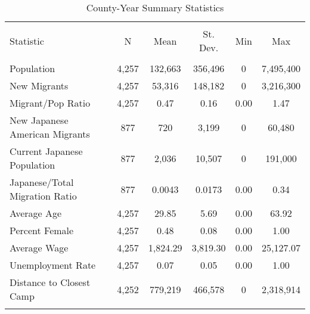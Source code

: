 
\begin{table}[!h] \centering 
  \caption{County-Year Summary Statistics} 
  \label{ctysumstats} 
\begin{tabular}{@{\extracolsep{5pt}}lccccc} 
\\[-1.8ex]\hline 
\hline \\[-1.8ex] 
Statistic & \multicolumn{1}{c}{N} & \multicolumn{1}{c}{Mean} & \multicolumn{1}{c}{St. Dev.} & \multicolumn{1}{c}{Min} & \multicolumn{1}{c}{Max} \\ 
\hline \\[-1.8ex] 
Population & 4,257 & 132,663 & 356,496 & 0 & 7,495,400 \\ 
New Migrants & 4,257 & 53,316 & 148,182 & 0 & 3,216,300 \\ 
Migrant/Pop Ratio & 4,257 & 0.47 & 0.16 & 0.00 & 1.47 \\ 
New Japanese American Migrants & 877 & 720 & 3,199 & 0 & 60,480 \\ 
Current Japanese Population & 877 & 2,036 & 10,507 & 0 & 191,000 \\ 
Japanese/Total Migration Ratio & 877 & 0.0043 & 0.0173 & 0.00 & 0.34 \\ 
Average Age & 4,257 & 29.85 & 5.69 & 0.00 & 63.92 \\ 
Percent Female & 4,257 & 0.48 & 0.08 & 0.00 & 1.00 \\ 
Average Wage & 4,257 & 1,824.29 & 3,819.30 & 0.00 & 25,127.07 \\ 
Unemployment Rate & 4,257 & 0.07 & 0.05 & 0.00 & 1.00 \\ 
Distance to Closest Camp & 4,252 & 779,219 & 466,578 & 0 & 2,318,914\\ 
\hline \\[-1.8ex] 
\end{tabular} 
\end{table} 
